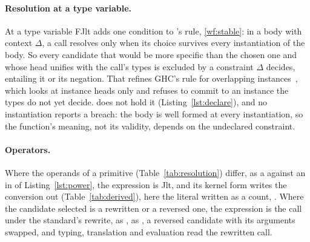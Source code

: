 \paragraph{Resolution at a type variable.}
At a type variable FJlt adds one condition to \Cpp{}'s rule, \ref{wf:stable}: in a body with context $\Delta$, a call resolves only when its choice survives every instantiation of the body.
So every candidate that would be more specific than the chosen one and whose head unifies with the call's types is excluded by a constraint $\Delta$ decides, entailing it or its negation.
That refines GHC's rule for overlapping instances~\cite{ghc2024overlapping}, which looks at instance heads only and refuses to commit to an instance the types do not yet decide.
\Cpp{} does not hold it (Listing~\ref{lst:declare}), and no instantiation reports a breach: the body is well formed at every instantiation, so the function's meaning, not its validity, depends on the undeclared constraint.

\paragraph{Operators.}
Where the operands of a primitive (Table~\ref{tab:resolution}) differ, as a  against an  in  of Listing~\ref{lst:power}, the expression is Jlt, and its kernel form writes the conversion out (Table~\ref{tab:derived}), here the literal written as a count, .
Where the candidate selected is a rewritten or a reversed one, the expression is the call under the standard's rewrite,  as ,  as , a reversed candidate with its arguments swapped, and typing, translation and evaluation read the rewritten call.

